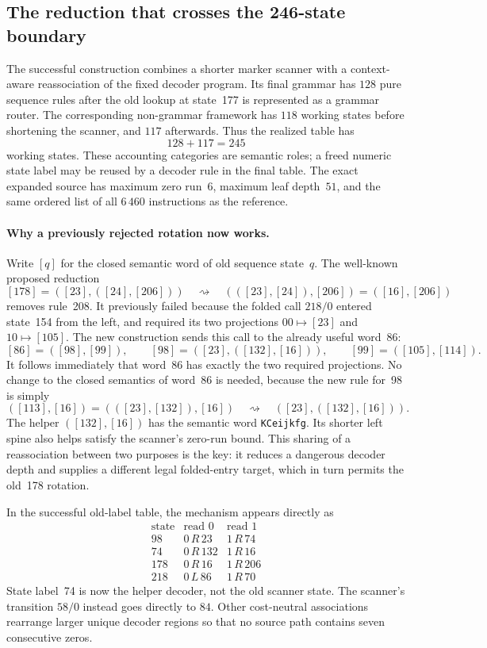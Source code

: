 \subsection{The reduction that crosses the 246-state boundary}
\label{sec:zero6-breakthrough}
The successful construction combines a shorter marker scanner with a
context-aware reassociation of the fixed decoder program.  Its final grammar
has $128$ pure sequence rules after the old lookup at state~177 is represented
as a grammar router.  The corresponding non-grammar framework has $118$
working states before shortening the scanner, and $117$ afterwards.  Thus the
realized table has
\[
 128+117=245
\]
working states.  These accounting categories are semantic roles; a freed
numeric state label may be reused by a decoder rule in the final table.
The exact expanded source has maximum zero run~$6$, maximum leaf depth~$51$,
and the same ordered list of all $6\,460$ instructions as the reference.

\paragraph{Why a previously rejected rotation now works.}
Write $[q]$ for the closed semantic word of old sequence state~$q$.  The
well-known proposed reduction
\[
 [178]=([23],([24],[206]))
       \quad\rightsquigarrow\quad
       (([23],[24]),[206])=([16],[206])
\]
removes rule~208.  It previously failed because the folded call $218/0$
entered state~154 from the left, and required its two projections
$00\mapsto[23]$ and $10\mapsto[105]$.
The new construction sends this call to the already useful word~86:
\[
 [86]=([98],[99]),\qquad
 [98]=([23],([132],[16])),\qquad
 [99]=([105],[114]).
\]
It follows immediately that word~86 has exactly the two required
projections.  No change to the closed semantics of word~86 is needed,
because the new rule for~98 is simply
\[
 ([113],[16])=(([23],[132]),[16])
       \quad\rightsquigarrow\quad
       ([23],([132],[16])).
\]
The helper $([132],[16])$ has the semantic word
\texttt{KCeijkfg}.  Its shorter left spine also helps satisfy the scanner's
zero-run bound.  This sharing of a reassociation between two purposes is the
key: it reduces a dangerous decoder depth and supplies a different legal
folded-entry target, which in turn permits the old~178 rotation.

In the successful old-label table, the mechanism appears directly as
\[
\begin{array}{c|cc}
\text{state}&\text{read }0&\text{read }1\\\hline
98 &0\,R\,23&1\,R\,74\\
74 &0\,R\,132&1\,R\,16\\
178&0\,R\,16&1\,R\,206\\
218&0\,L\,86&1\,R\,70
\end{array}
\]
State label~74 is now the helper decoder, not the old scanner state.
The scanner's transition $58/0$ instead goes directly to $84$.
Other cost-neutral associations rearrange larger unique decoder regions so
that no source path contains seven consecutive zeros.

